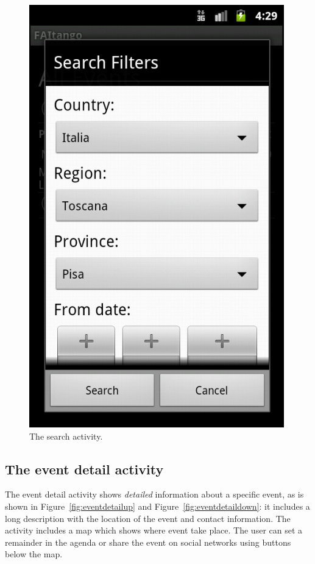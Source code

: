\documentclass[12pt, twoside]{article}
\begin{document}
\begin{figure}[h]
\begin{center}
\includegraphics[scale=0.50]{fig/search-activity.png}
\end{center}
\caption{The search activity.}
\label{fig:searchdialog}
\end{figure}

\subsection{The event detail activity}

The event detail activity shows \emph{detailed} information about a specific event, as is shown in Figure~\ref{fig:eventdetailup} and Figure~\ref{fig:eventdetaildown}: it includes a long description with the location of the event and contact information. The activity includes a map which shows where event take place. The user can set a remainder in the agenda or share the event on social networks using buttons below the map.
\end{document}
